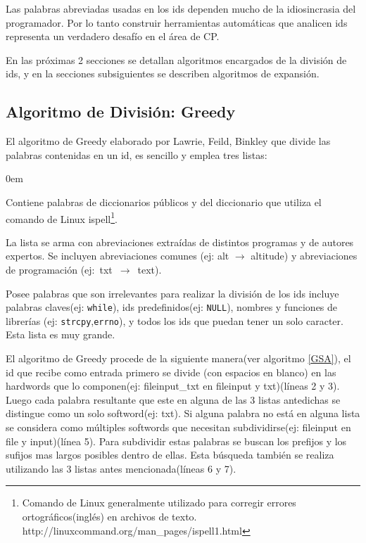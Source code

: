 \documentclass[a4paper,12pt]{report}
\begin{document}
Las palabras abreviadas usadas en los ids dependen mucho de la idiosincrasia del programador. Por lo tanto construir herramientas automáticas que analicen ids representa un verdadero desafío en el área de CP.

En las próximas 2 secciones se detallan algoritmos encargados de la división de ids, y en la secciones subsiguientes se describen algoritmos de expansión.


\subsection{Algoritmo de División: Greedy}

El algoritmo de Greedy elaborado por Lawrie, Feild, Binkley\cite{DLFB06,FBL06,HDD06,LFBEX07,EHPV09} que divide las palabras contenidas en un id, es sencillo y emplea tres listas:
\begin{description}
\itemsep0em%
\item[Palabras de diccionarios:] Contiene palabras de diccionarios públicos y del diccionario que utiliza el comando de Linux \textsf{ispell}\footnote[1]{Comando de Linux generalmente utilizado para corregir errores ortográficos(inglés) en archivos de texto. http://linuxcommand.org/man\_pages/ispell1.html}.

\item[Abreviaciones conocidas:] La lista se arma con abreviaciones extraídas de distintos programas y de autores expertos. Se incluyen abreviaciones comunes (ej: \textsf{alt} $\rightarrow$ \textsf{altitude}) y abreviaciones de programación \mbox{(ej: \textsf{txt} $\rightarrow$ \textsf{text}).}

\item[Palabras excluyentes(stop list):] Posee palabras que son irrelevantes para realizar la división de los ids incluye palabras claves(ej: \texttt{while}), ids predefinidos(ej: \texttt{NULL}), nombres y funciones de librerías (ej: \texttt{strcpy},\texttt{errno}), y todos los ids que puedan tener un solo caracter. Esta lista es muy grande.
\end{description}

El algoritmo de Greedy procede de la siguiente manera(ver algoritmo \ref{GSA}), el id que recibe como entrada primero se divide (con espacios en blanco) en las hardwords que lo componen(ej: \textsf{fileinput\_txt} en \textsf{fileinput} y \textsf{txt})(líneas 2 y 3). Luego cada palabra resultante que este en alguna de las 3 listas antedichas se distingue como un solo softword(ej: \textsf{txt}). Si alguna palabra no está en alguna lista se considera como múltiples softwords que necesitan subdividirse(ej: \textsf{fileinput} en \textsf{file} y \textsf{input})(línea 5). Para subdividir estas palabras se buscan los prefijos y los sufijos mas largos posibles dentro de ellas. Esta búsqueda también se realiza utilizando las 3 listas antes mencionada(líneas 6 y 7).
\end{document}
